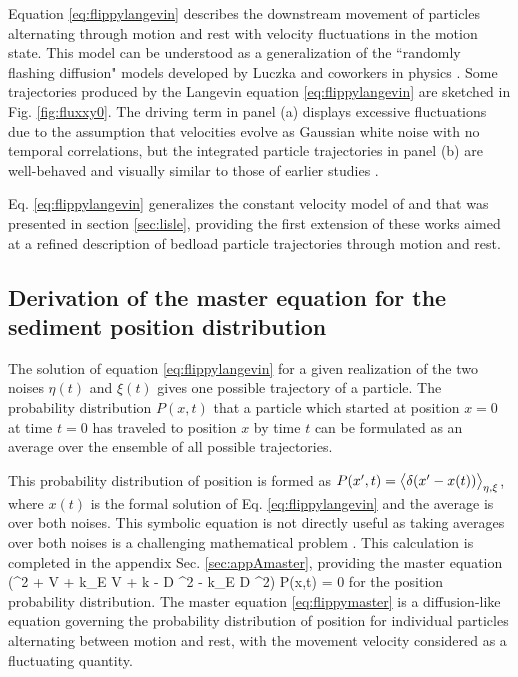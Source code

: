 Equation \ref{eq:flippylangevin} describes the downstream movement of particles alternating through motion and rest with velocity fluctuations in the motion state.
This model can be understood as a generalization of the ``randomly flashing diffusion" models developed by Luczka and coworkers in physics \citep{Luczka1992,Luczka1993,Luczka1995}.
Some trajectories produced by the Langevin equation \ref{eq:flippylangevin} are sketched in Fig. \ref{fig:fluxxy0}.
The driving term in panel (a) displays excessive fluctuations due to the assumption that velocities evolve as Gaussian white noise with no temporal correlations, but the integrated particle trajectories in panel (b) are well-behaved and visually similar to those of earlier studies \citep[cf.][]{Fan2016,Bialik2015}.

Eq. \ref{eq:flippylangevin} generalizes the constant velocity model of \citet{Lisle1998} and \citet{Lajeunesse2017} that was presented in section \ref{sec:lisle}, providing the first extension of these works aimed at a refined description of bedload particle trajectories through motion and rest.


\subsection{Derivation of the master equation for the sediment position distribution}
\label{sec:floppymastereq}
The solution of equation \ref{eq:flippylangevin} for a given realization of the two noises $\eta(t)$ and $\xi(t)$ gives one possible trajectory of a particle. The probability distribution $P(x,t)$ that a particle which started at position $x=0$ at time $t=0$ has traveled to position $x$ by time $t$ can be formulated as an average over the ensemble of all possible trajectories.

This probability distribution of position is formed as $ P(x',t) = \big\langle \delta(x'-x(t))\big\rangle_{\eta,\xi} $, where $x(t)$ is the formal solution of Eq. \ref{eq:flippylangevin} and the average is over both noises.
This symbolic equation is not directly useful as taking averages over both noises is a challenging mathematical problem \citep[e.g.][]{Hanggi1978}. This calculation is completed in the appendix Sec. \ref{sec:appAmaster}, providing the master equation
\be (\pt^2 + V \px \pt + k_E V \px + k \pt - D \px^2 \pt - k_E D \px^2) P(x,t) = 0 \label{eq:flippymaster}\ee
for the position probability distribution.
The master equation \ref{eq:flippymaster} is a diffusion-like equation governing the probability distribution of position for individual particles alternating between motion and rest, with the movement velocity considered as a fluctuating quantity.

